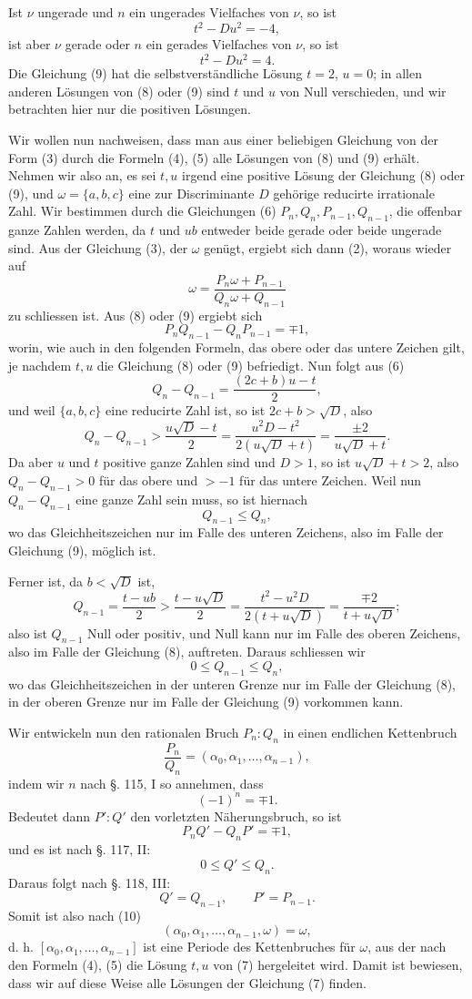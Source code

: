 \documentclass[11pt]{article}
\begin{document}
Ist $\nu$ ungerade und $n$ ein ungerades Vielfaches von $\nu$, so ist
\[
\tag{8}        t^2-Du^2=-4,
\]
ist aber $\nu$ gerade oder $n$ ein gerades Vielfaches von $\nu$, so ist
\[
\tag{9}        t^2-Du^2=4.
\]
Die Gleichung (9) hat die selbstverständliche Lösung $t=2$, $u=0$; in allen anderen Lösungen von (8) oder (9) sind $t$ und $u$ von Null verschieden, und wir betrachten hier nur die positiven Lösungen.

Wir wollen nun nachweisen, dass man aus einer beliebigen Gleichung von der Form (3) durch die Formeln (4), (5) alle Lösungen von (8) und (9) erhält. Nehmen wir also an, es sei $t,u$ irgend eine positive Lösung der Gleichung (8) oder (9), und $\omega=\{a,b,c\}$ eine zur Discriminante $D$ gehörige reducirte irrationale Zahl. Wir bestimmen durch die Gleichungen (6) $P_n,Q_n,P_{n-1},Q_{n-1}$, die offenbar ganze Zahlen werden, da $t$ und $ub$ entweder beide gerade oder beide ungerade sind. Aus der Gleichung (3), der $\omega$ genügt, ergiebt sich dann (2), woraus wieder auf
\[
\tag{10}       \omega=\frac{P_n\omega+P_{n-1}}{Q_n\omega+Q_{n-1}}
\]
zu schliessen ist. Aus (8) oder (9) ergiebt sich
\[
\tag{11}       P_nQ_{n-1}-Q_nP_{n-1}=\mp1,
\]
worin, wie auch in den folgenden Formeln, das obere oder das untere Zeichen gilt, je nachdem $t,u$ die Gleichung (8) oder (9) befriedigt. Nun folgt aus (6)
\[
        Q_n-Q_{n-1}=\frac{(2c+b)u-t}{2},
\]
und weil $\{a,b,c\}$ eine reducirte Zahl ist, so ist $2c+b>\sqrt D$, also
\[
        Q_n-Q_{n-1}>
\frac{u\sqrt D-t}{2}
=\frac{u^2D-t^2}{2(u\sqrt D+t)}
=\frac{\pm2}{u\sqrt D+t}.
\]
Da aber $u$ und $t$ positive ganze Zahlen sind und $D>1$, so ist $u\sqrt D+t>2$, also $Q_n-Q_{n-1}>0$ für das obere und $>-1$ für das untere Zeichen. Weil nun $Q_n-Q_{n-1}$ eine ganze Zahl sein muss, so ist hiernach
\[
        Q_{n-1}\le Q_n,
\]
wo das Gleichheitszeichen nur im Falle des unteren Zeichens, also im Falle der Gleichung (9), möglich ist.

Ferner ist, da $b<\sqrt D$ ist,
\[
        Q_{n-1}=\frac{t-ub}{2}>
\frac{t-u\sqrt D}{2}
=\frac{t^2-u^2D}{2(t+u\sqrt D)}
=\frac{\mp2}{t+u\sqrt D};
\]
also ist $Q_{n-1}$ Null oder positiv, und Null kann nur im Falle des oberen Zeichens, also im Falle der Gleichung (8), auftreten. Daraus schliessen wir
\[
\tag{12}       0\le Q_{n-1}\le Q_n,
\]
wo das Gleichheitszeichen in der unteren Grenze nur im Falle der Gleichung (8), in der oberen Grenze nur im Falle der Gleichung (9) vorkommen kann.

Wir entwickeln nun den rationalen Bruch $P_n:Q_n$ in einen endlichen Kettenbruch
\[
        \frac{P_n}{Q_n}=(\alpha_0,\alpha_1,\ldots,\alpha_{n-1}),
\]
indem wir $n$ nach §. 115, I so annehmen, dass
\[
        (-1)^n=\mp1.
\]
Bedeutet dann $P':Q'$ den vorletzten Näherungsbruch, so ist
\[
        P_nQ'-Q_nP'=\mp1,
\]
und es ist nach §. 117, II:
\[
        0\le Q'\le Q_n.
\]
Daraus folgt nach §. 118, III:
\[
        Q'=Q_{n-1},\qquad P'=P_{n-1}.
\]
Somit ist also nach (10)
\[
        (\alpha_0,\alpha_1,\ldots,\alpha_{n-1},\omega)=\omega,
\]
d. h. $[\alpha_0,\alpha_1,\ldots,\alpha_{n-1}]$ ist eine Periode des Kettenbruches für $\omega$, aus der nach den Formeln (4), (5) die Lösung $t,u$ von (7) hergeleitet wird. Damit ist bewiesen, dass wir auf diese Weise alle Lösungen der Gleichung (7) finden.
\end{document}
